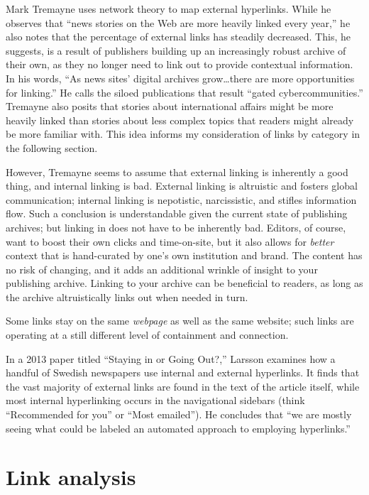 Mark Tremayne uses network theory to map external hyperlinks. While he observes that ``news stories on the Web are more heavily linked every year,'' he also notes that the percentage of external links has steadily decreased.\autocite{tremayne_applying_network_theory} This, he suggests, is a result of publishers building up an increasingly robust archive of their own, as they no longer need to link out to provide contextual information. In his words, ``As news sites' digital archives grow\ldots there are more opportunities for linking.''\autocite{tremayne_web_of_context} He calls the siloed publications that result ``gated cybercommunities.'' Tremayne also posits that stories about international affairs might be more heavily linked than stories about less complex topics that readers might already be more familiar with. This idea informs my consideration of links by category in the following section.

However, Tremayne seems to assume that external linking is inherently a good thing, and internal linking is bad. External linking is altruistic and fosters global communication; internal linking is nepotistic, narcissistic, and stifles information flow. Such a conclusion is understandable given the current state of publishing archives; but linking in does not have to be inherently bad. Editors, of course, want to boost their own clicks and time-on-site, but it also allows for \emph{better} context that is hand-curated by one's own institution and brand. The content has no risk of changing, and it adds an additional wrinkle of insight to your publishing archive. Linking to your archive can be beneficial to readers, as long as the archive altruistically links out when needed in turn.

Some links stay on the same \emph{webpage} as well as the same website; such links are operating at a still different level of containment and connection.

In a 2013 paper titled ``Staying in or Going Out?,'' Larsson examines how a handful of Swedish newspapers use internal and external hyperlinks. It finds that the vast majority of external links are found in the text of the article itself, while most internal hyperlinking occurs in the navigational sidebars (think ``Recommended for you'' or ``Most emailed''). He concludes that ``we are mostly seeing what could be labeled an automated approach to employing hyperlinks.''\autocite{larsson_staying_2013}

\section{Link analysis}

